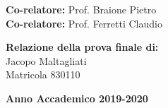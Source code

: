 \begin{titlepage}
    \noindent
    {\large \textbf{Co-relatore:} Prof. Braione Pietro } \\
    
    \noindent
    {\large \textbf{Co-relatore:} Prof. Ferretti Claudio }

    \vspace{15mm}

    \begin{flushright}
        {\large \textbf{Relazione della prova finale di:}} \\
        \large{Jacopo Maltagliati} \\
        \large{Matricola 830110}
    \end{flushright}

    \vspace{2mm}

    \begin{center}
        {\large{\bf Anno Accademico 2019-2020}}
    \end{center}

    \restoregeometry

\end{titlepage}